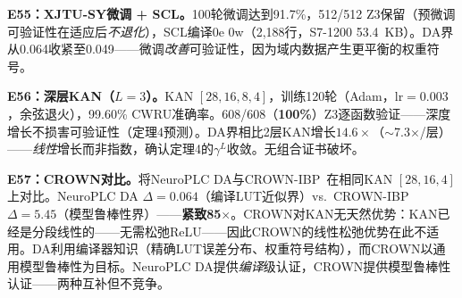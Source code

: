 \documentclass[journal,onecolumn]{IEEEtran}
\theoremstyle{definition}
\theoremstyle{plain}
\theoremstyle{remark}
\begin{document}
\noindent\textbf{E55：XJTU-SY微调 + SCL。}100轮微调达到91.7\%，512/512 Z3保留（预微调可验证性在适应后\textit{不退化}），SCL编译0e 0w（2,188行，S7-1200 53.4~KB）。DA界从0.064收紧至0.049——微调\textit{改善}可验证性，因为域内数据产生更平衡的权重符号。

\noindent\textbf{E56：深层KAN（$L=3$）。}KAN $[28,16,8,4]$，训练120轮（Adam，lr$=0.003$，余弦退火），99.60\% CWRU准确率。608/608（\textbf{100\%}）Z3逐函数验证——深度增长不损害可验证性（定理4预测）。DA界相比2层KAN增长$\mathbf{14.6\times}$（$\sim$7.3$\times$/层）——\textit{线性}增长而非指数，确认定理4的$\gamma^L$收敛。无组合证书破坏。

\noindent\textbf{E57：CROWN对比。}将NeuroPLC DA与CROWN-IBP~\cite{zhang2018crown}在相同KAN $[28,16,4]$上对比。NeuroPLC DA $\Delta=0.064$（编译LUT近似界）vs.\ CROWN-IBP $\Delta=5.45$（模型鲁棒性界）——\textbf{紧致85$\times$}。CROWN对KAN无天然优势：KAN已经是分段线性的——无需松弛ReLU——因此CROWN的线性松弛优势在此不适用。DA利用编译器知识（精确LUT误差分布、权重符号结构），而CROWN以通用模型鲁棒性为目标。NeuroPLC DA提供\textit{编译}级认证，CROWN提供模型鲁棒性认证——两种互补但不竞争。

\end{document}
